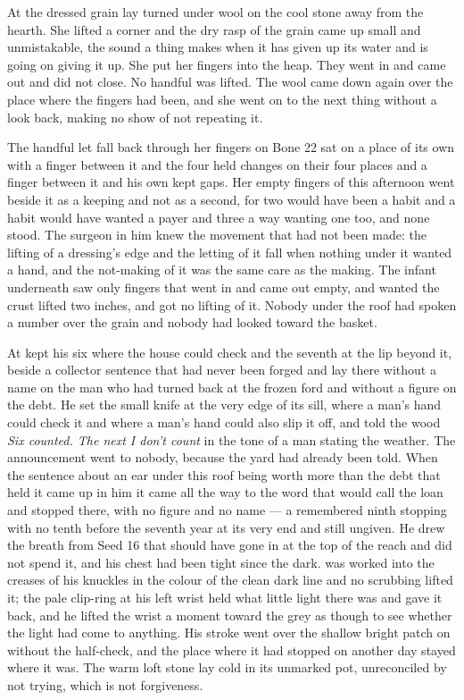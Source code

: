 \scenebreak

At  the dressed grain lay turned under wool on the cool stone away from the hearth. She lifted a corner and the dry rasp of the grain came up small and unmistakable, the sound a thing makes when it has given up its water and is going on giving it up. She put her fingers into the heap. They went in and came out and did not close. No handful was lifted. The wool came down again over the place where the fingers had been, and she went on to the next thing without a look back, making no show of not repeating it.

The handful let fall back through her fingers on Bone 22 sat on a place of its own with a finger between it and the four held changes on their four places and a finger between it and his own kept gaps. Her empty fingers of this afternoon went beside it as a keeping and not as a second, for two would have been a habit and a habit would have wanted a payer and three a way wanting one too, and none stood. The surgeon in him knew the movement that had not been made: the lifting of a dressing's edge and the letting of it fall when nothing under it wanted a hand, and the not-making of it was the same care as the making. The infant underneath saw only fingers that went in and came out empty, and wanted the crust lifted two inches, and got no lifting of it. Nobody under the roof had spoken a number over the grain and nobody had looked toward the basket.

At   kept his six where the house could check and the seventh at the lip beyond it, beside a collector sentence that had never been forged and lay there without a name on the man who had turned back at the frozen ford and without a figure on the debt. He set the small knife at the very edge of its sill, where a man's hand could check it and where a man's hand could also slip it off, and told the wood \emph{Six counted. The next I don't count} in the tone of a man stating the weather. The announcement went to nobody, because the yard had already been told. When the sentence about an ear under this roof being worth more than the debt that held it came up in him it came all the way to the word that would call the loan and stopped there, with no figure and no name --- a remembered ninth stopping with no tenth before the seventh year at its very end and still ungiven. He drew the breath from Seed 16 that should have gone in at the top of the reach and did not spend it, and his chest had been tight since the dark.  was worked into the creases of his knuckles in the colour of the clean dark line and no scrubbing lifted it; the pale clip-ring at his left wrist held what little light there was and gave it back, and he lifted the wrist a moment toward the grey as though to see whether the light had come to anything. His stroke went over the shallow bright patch on  without the half-check, and the place where it had stopped on another day stayed where it was. The warm loft stone lay cold in its unmarked pot, unreconciled by not trying, which is not forgiveness.

